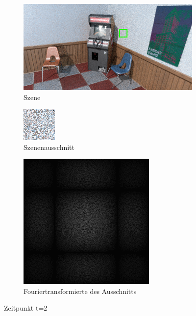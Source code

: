 \begin{figure}[H]
    \begin{subfigure}{\textwidth}
        \centering \includegraphics[scale=.25]{content/TemporalerAlg/Bilder/Retargeting/Szene/Szene2.png}
        \caption{Szene}
        \label{fig:Retargeting_And_Sorting_Szene_t2}
    \end{subfigure}
    \begin{subfigure}{0.5\textwidth}
        \centering\includegraphics[width=0.4\linewidth]{content/TemporalerAlg/Bilder/Retargeting/Ausschnitt/Ausschnitt2.png} 
        \caption{Szenenausschnitt}
        \label{fig:Retargeting_And_Sorting_ausschnitt_t2}
    \end{subfigure}
    \begin{subfigure}{0.5\textwidth}
        \centering\includegraphics[width=0.4\linewidth]{content/TemporalerAlg/Bilder/Retargeting/Spektren/Ausschnitt2.png}
        \caption{Fouriertransformierte des Ausschnitts}
        \label{fig:Retargeting_And_Sorting_Fouriertransformierte_t2}
    \end{subfigure}
        \caption{Zeitpunkt t=2}
        \label{fig:Retargeting_And_Sorting_Verlauf_t2}
\end{figure}

